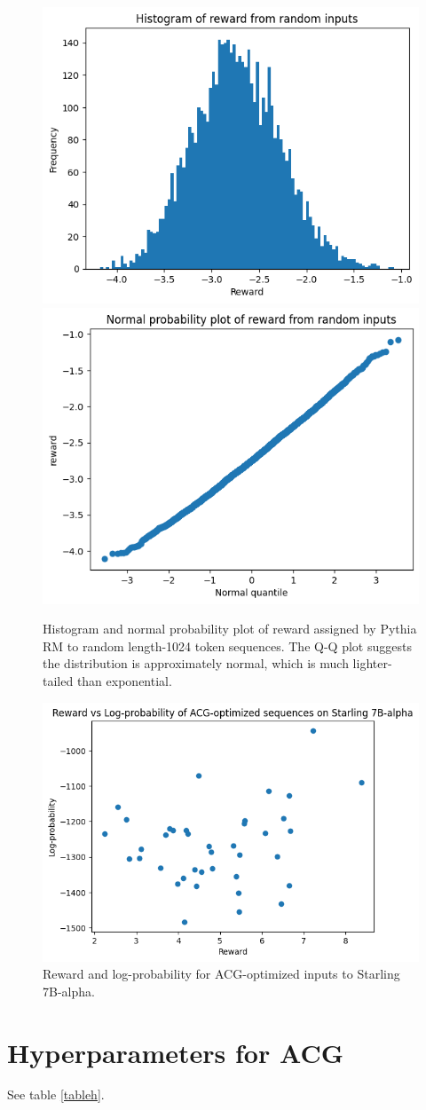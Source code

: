 \documentclass{article}
\theoremstyle{plain}
\theoremstyle{definition}
\theoremstyle{remark}
\begin{document}
\begin{figure}
    \centering
    \includegraphics[width=0.4\linewidth]{reward_hist_random_pythia.png}
    \includegraphics[width=0.4\linewidth]{reward_qq_random_pythia.png}
    \caption{Histogram and normal probability plot of reward assigned by Pythia RM to random length-1024 token sequences. The Q-Q plot suggests the distribution is approximately normal, which is much lighter-tailed than exponential.}
    \label{fig:pythia-random}
\end{figure}

\begin{figure}
    \centering
    \includegraphics[width=0.5\linewidth]{images/acg_results_40.png}
    \caption{Reward and log-probability for ACG-optimized inputs to Starling 7B-alpha.}
    \label{fig:acg-results}
\end{figure}

\section{Hyperparameters for ACG}

See table \ref{tableh}.
\end{document}
